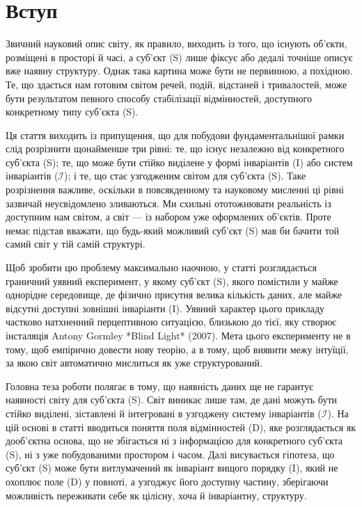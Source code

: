 \documentclass[aps,prd,onecolumn,nofootinbib,superscriptaddress]{revtex4-2}
\begin{document}
\section{Вступ}
Звичний науковий опис світу, як правило, виходить із того, що існують об’єкти, розміщені в просторі й часі, а суб’єкт (S) лише фіксує або дедалі точніше описує вже наявну структуру. Однак така картина може бути не первинною, а похідною. Те, що здається нам готовим світом речей, подій, відстаней і тривалостей, може бути результатом певного способу стабілізації відмінностей, доступного конкретному типу суб’єкта (S).

Ця стаття виходить із припущення, що для побудови фундаментальнішої рамки слід розрізнити щонайменше три рівні: те, що існує незалежно від конкретного суб’єкта (S); те, що може бути стійко виділене у формі інваріантів (I) або систем інваріантів ($\mathcal{I}$); і те, що стає узгодженим світом для суб’єкта (S). Таке розрізнення важливе, оскільки в повсякденному та науковому мисленні ці рівні зазвичай неусвідомлено зливаються. Ми схильні ототожнювати реальність із доступним нам світом, а світ — із набором уже оформлених об’єктів. Проте немає підстав вважати, що будь-який можливий суб’єкт (S) мав би бачити той самий світ у тій самій структурі.

Щоб зробити цю проблему максимально наочною, у статті розглядається граничний уявний експеримент, у якому суб’єкт (S), якого помістили у майже однорідне середовище, де фізично присутня велика кількість даних, але майже відсутні доступні зовнішні інваріанти (I). Уявний характер цього прикладу частково натхненний перцептивною ситуацією, близькою до тієї, яку створює інсталяція Antony Gormley *Blind Light* (2007). Мета цього експерименту не в тому, щоб емпірично довести нову теорію, а в тому, щоб виявити межу інтуїції, за якою світ автоматично мислиться як уже структурований.

Головна теза роботи полягає в тому, що наявність даних ще не гарантує наявності світу для суб’єкта (S). Світ виникає лише там, де дані можуть бути стійко виділені, зіставлені й інтегровані в узгоджену систему інваріантів ($\mathcal{I}$). На цій основі в статті вводиться поняття поля відмінностей (D), яке розглядається як дооб’єктна основа, що не збігається ні з інформацією для конкретного суб’єкта (S), ні з уже побудованими простором і часом. Далі висувається гіпотеза, що суб’єкт (S) може бути витлумачений як інваріант вищого порядку (I), який не охоплює поле (D) у повноті, а узгоджує його доступну частину, зберігаючи можливість переживати себе як цілісну, хоча й інваріантну, структуру.
\end{document}
